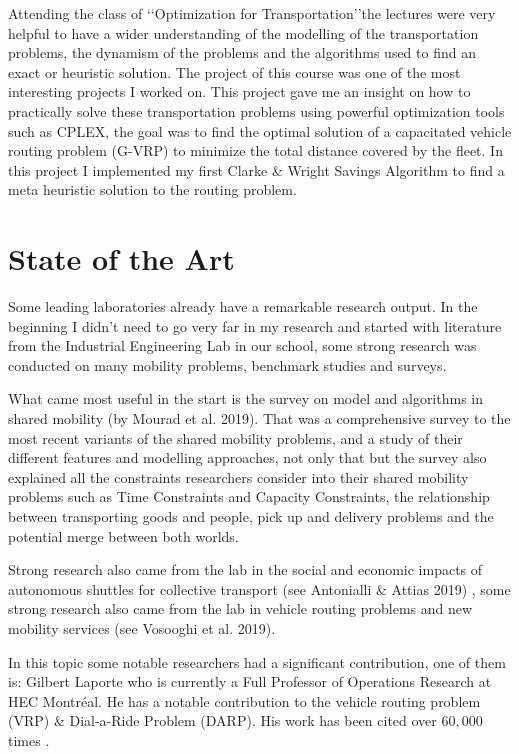 \documentclass{article}
\begin{document}
Attending the class of \lq\lq{Optimization for Transportation}\rq\rq the lectures were very helpful to have a wider understanding of the modelling of the transportation problems, the dynamism of the problems and the algorithms used to find an exact or heuristic solution. 
The project of this course was one of the most interesting projects I worked on. This project gave me an insight on how to practically solve these transportation problems using powerful optimization tools such as CPLEX, the goal was to find the optimal solution of a capacitated vehicle routing problem (G-VRP) to minimize the total distance covered by the fleet. In this project I implemented my first Clarke \& Wright Savings Algorithm to find a meta heuristic solution to the routing problem.


\section{State of the Art}
\label{sec:literature}


Some leading laboratories already have a remarkable research output. In the beginning I didn\rq{t} need to go very far in my research and started with literature from the Industrial Engineering Lab in our school, some strong research was conducted on many mobility problems, benchmark studies and surveys. 

What came most useful in the start is the survey on model and algorithms in shared mobility (by Mourad et al. 2019)\cite{MOURAD2019}. That was a comprehensive survey to the most recent variants of the shared mobility
problems, and a study of their different features and modelling approaches, not only that but the survey also explained all the constraints researchers consider into their shared mobility problems such as Time Constraints and Capacity Constraints, the relationship between transporting goods and people, pick up and delivery problems and the potential merge between both worlds. 

Strong research also came from the lab in the social and economic impacts of autonomous shuttles for collective transport (see Antonialli \& Attias 2019) \cite{antonialli2019}, some strong research also came from the lab in vehicle routing problems and new mobility services (see Vosooghi et al. 2019)\cite{VOSOOGHI201915}\cite{vosooghi2019}.

In this topic some notable researchers had a significant contribution, one of them is: Gilbert Laporte who is currently a Full Professor of Operations Research at HEC Montréal. He has a notable contribution to the vehicle routing problem (VRP) \& Dial-a-Ride Problem (DARP). His work has been cited over $60,000$ times \cite{gilbert_laporte_profile}.
\end{document}
